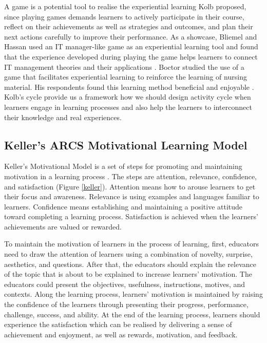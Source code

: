 \documentclass[12pt, a4paper]{report}
\begin{document}
A game is a potential tool to realise the experiential learning Kolb proposed, since playing games demands learners to actively participate in their course, reflect on their achievements as well as strategies and outcomes, and plan their next actions carefully to improve their performance. As a showcase, Bliemel and Hassan used an IT manager-like game as an experiential learning tool and found that the experience developed during playing the game helps learners to connect IT management theories and their applications \cite{bliemel2014game}. Boctor studied the use of a game that facilitates experiential learning to reinforce the learning of nursing material. His respondents found this learning method beneficial and enjoyable \cite{boctor2013active}. Kolb's cycle provide us a framework how we should design activity cycle when learners engage in learning processes and also help the learners to interconnect their knowledge and real experiences. 
 
\subsection{Keller's ARCS Motivational Learning Model}
Keller's Motivational Model is a set of steps for promoting and maintaining motivation in a learning process \cite{keller2010motivational}. The steps are attention, relevance, confidence, and satisfaction (Figure \ref{keller}). Attention means how to arouse learners to get their focus and awareness. Relevance is using examples and languages familiar to learners. Confidence means establishing and maintaining a positive attitude toward completing a learning process. Satisfaction is achieved when the learners' achievements are valued or rewarded. 

To maintain the motivation of learners in the process of learning, first, educators need to draw the attention of learners using a combination of novelty, surprise, aesthetics, and questions. After that, the educators should explain the relevance of the topic that is about to be explained to increase learners' motivation. The educators could present the objectives, usefulness, instructions, motives, and contexts. Along the learning process, learners' motivation is maintained by raising the confidence of the learners through presenting their progress, performance, challenge, success, and ability. At the end of the learning process, learners should experience the satisfaction which can be realised by delivering a sense of achievement and enjoyment, as well as rewards, motivation, and feedback.
\end{document}
